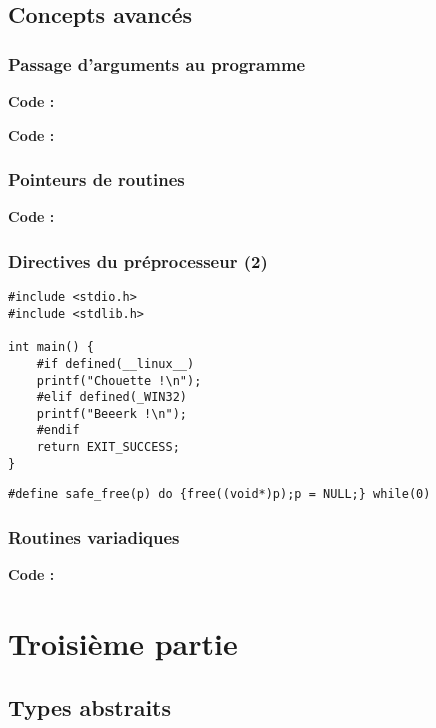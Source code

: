 \documentclass[../main.tex]{subfiles}
\begin{document}
\subsection{Concepts avancés}
\subsubsection{Passage d'arguments au programme}

\textbf{Code :} 


\textbf{Code :} 
\subsubsection{Pointeurs de routines}

\textbf{Code :} 
\subsubsection{Directives du préprocesseur (2)}
\begin{verbatim}
#include <stdio.h>
#include <stdlib.h>

int main() {
	#if defined(__linux__)
	printf("Chouette !\n");
	#elif defined(_WIN32)
	printf("Beeerk !\n");
	#endif
	return EXIT_SUCCESS;
}
\end{verbatim}
\begin{verbatim}
#define safe_free(p) do {free((void*)p);p = NULL;} while(0)
\end{verbatim}
\subsubsection{Routines variadiques}

\textbf{Code :} 
\section{Troisième partie}
\subsection{Types abstraits}
\end{document}
